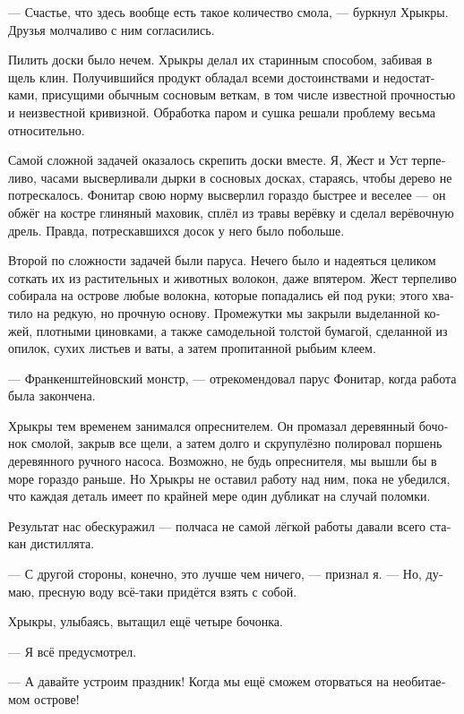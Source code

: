 \documentclass[a4paper,12pt,fleqn]{book}\usepackage{polyglossia}\setdefaultlanguage[babelshorthands=true]{russian}\setotherlanguage{english}\defaultfontfeatures{Ligatures=TeX,Mapping=tex-text}
\newcommand{\asterism}{\vspace{1em}{\centering\Large\bfseries$\ast~\ast~\ast$\par}\vspace{1em}}
\begin{document}
--- Счастье, что здесь вообще есть такое количество смола, --- буркнул Хрыкры.
Друзья молчаливо с ним согласились.

Пилить доски было нечем.
Хрыкры делал их старинным способом, забивая в щель клин.
Получившийся продукт обладал всеми достоинствами и недостатками, присущими обычным сосновым веткам, в том числе известной прочностью и неизвестной кривизной.
Обработка паром и сушка решали проблему весьма относительно.

Самой сложной задачей оказалось скрепить доски вместе.
Я, Жест и Уст терпеливо, часами высверливали дырки в сосновых досках, стараясь, чтобы дерево не потрескалось.
Фонитар свою норму высверлил гораздо быстрее и веселее --- он обжёг на костре глиняный маховик, сплёл из травы верёвку и сделал верёвочную дрель.
Правда, потрескавшихся досок у него было побольше.

Второй по сложности задачей были паруса.
Нечего было и надеяться целиком соткать их из растительных и животных волокон, даже впятером.
Жест терпеливо собирала на острове любые волокна, которые попадались ей под руки;
этого хватило на редкую, но прочную основу.
Промежутки мы закрыли выделанной кожей, плотными циновками, а также самодельной толстой бумагой, сделанной из опилок, сухих листьев и ваты, а затем пропитанной рыбьим клеем.

--- Франкенштейновский монстр, --- отрекомендовал парус Фонитар, когда работа была закончена.

\asterism

Хрыкры тем временем занимался опреснителем.
Он промазал деревянный бочонок смолой, закрыв все щели, а затем долго и скрупулёзно полировал поршень деревянного ручного насоса.
Возможно, не будь опреснителя, мы вышли бы в море гораздо раньше.
Но Хрыкры не оставил работу над ним, пока не убедился, что каждая деталь имеет по крайней мере один дубликат на случай поломки.

Результат нас обескуражил --- полчаса не самой лёгкой работы давали всего стакан дистиллята.

--- С другой стороны, конечно, это лучше чем ничего, --- признал я.
--- Но, думаю, пресную воду всё-таки придётся взять с собой.

Хрыкры, улыбаясь, вытащил ещё четыре бочонка.

--- Я всё предусмотрел.

\asterism

--- А давайте устроим праздник!
Когда мы ещё сможем оторваться на необитаемом острове!
\end{document}
